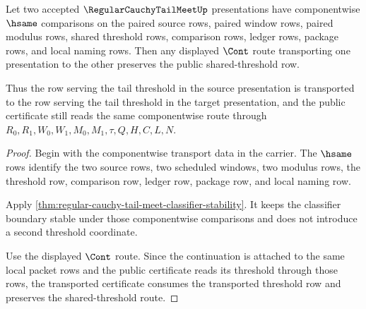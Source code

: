 \begin{theorem}
\label{thm:regular-cauchy-tail-meet-shared-threshold-transport}
Let two accepted $\RegularCauchyTailMeetUp$ presentations have componentwise $\hsame$ comparisons on the paired source rows, paired window rows, paired modulus rows, shared threshold rows, comparison rows, ledger rows, package rows, and local naming rows. Then any displayed $\Cont$ route transporting one presentation to the other preserves the public shared-threshold row.

Thus the row serving the tail threshold in the source presentation is transported to the row serving the tail threshold in the target presentation, and the public certificate still reads the same componentwise route through $R_0,R_1,W_0,W_1,M_0,M_1,\tau,Q,H,C,L,N$.
\end{theorem}
\begin{proof}
Begin with the componentwise transport data in the carrier. The $\hsame$ rows identify the two source rows, two scheduled windows, two modulus rows, the threshold row, comparison row, ledger row, package row, and local naming row.

Apply \autoref{thm:regular-cauchy-tail-meet-classifier-stability}. It keeps the classifier boundary stable under those componentwise comparisons and does not introduce a second threshold coordinate.

Use the displayed $\Cont$ route. Since the continuation is attached to the same local packet rows and the public certificate reads its threshold through those rows, the transported certificate consumes the transported threshold row and preserves the shared-threshold route.
\end{proof}

